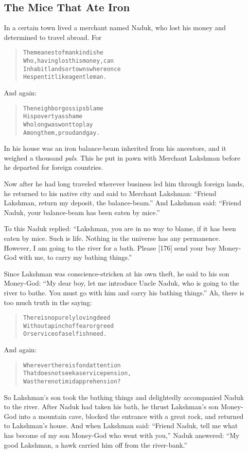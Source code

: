 \documentclass[article, twoside, 14pt]{memoir}
\renewenvironment{verbatim}{%
\begin{quote}%
\vskip -10pt%
\begin{alltt}\normalfont\large}{\end{alltt}%
\end{quote}%
\vskip -10pt
} %
\begin{document}
\subsection{The Mice That Ate Iron}

\label{s31}

In a certain town lived a merchant named Naduk, who lost his money
and determined to travel abroad. For

\begin{verbatim}
The meanest of mankind is he
    Who, having lost his money, can
Inhabit lands or towns where once
    He spent it like a gentleman.
\end{verbatim}
And again:

\begin{verbatim}
The neighbor gossips blame
His poverty as shame
Who long was wont to play
Among them, proud and gay.
\end{verbatim}
In his house was an iron balance-beam inherited from his ancestors,
and it weighed a thousand \emph{pals}. This he put in pawn with
Merchant Lakshman before he departed for foreign countries.

Now after he had long traveled wherever business led him through
foreign lands, he returned to his native city and said to Merchant
Lakshman: ``Friend Lakshman, return my deposit, the balance-beam.''
And Lakshman said:
``Friend Naduk, your balance-beam has been eaten by mice.''

To this Naduk replied:
``Lakshman, you are in no way to blame, if it has been eaten by mice. Such is life. Nothing in the universe has any permanence. However, I am going to the river for a bath. Please [176] send your boy Money-God with me, to carry my bathing things.''

Since Lakshman was conscience-stricken at his own theft, he said to
his son Money-God:
``My dear boy, let me introduce Uncle Naduk, who is going to the river to bathe. You must go with him and carry his bathing things.''
Ah, there is too much truth in the saying:

\begin{verbatim}
There is no purely loving deed
Without a pinch of fear or greed
Or service of a selfish need.
\end{verbatim}
And again:

\begin{verbatim}
Wherever there is fond attention
That does not seek a service pension,
Was there no timid apprehension?
\end{verbatim}
So Lakshman's son took the bathing things and delightedly
accompanied Naduk to the river. After Naduk had taken his bath, he
thrust Lakshman's son Money-God into a mountain cave, blocked the
entrance with a great rock, and returned to Lakshman's house. And
when Lakshman said:
``Friend Naduk, tell me what has become of my son Money-God who went with you,''
Naduk answered:
``My good Lakshman, a hawk carried him off from the river-bank.''
\end{document}
